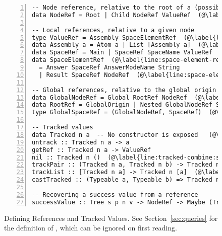 \begin{figure}[t]
\begin{lncodebox}
\begin{lstlisting}[style=haskell,numbers=left]
-- Node reference, relative to the root of a (possibly nested) tree
data NodeRef = Root | Child NodeRef ValueRef  (@\label{line:node-ref}@)

-- Local references, relative to a given node
type ValueRef = Assembly SpaceElementRef  (@\label{line:value-ref}@)
data Assembly a = Atom a | List [Assembly a]  (@\label{line:assembly}@)
data SpaceRef = Main | SpaceRef SpaceName ValueRef  (@\label{line:space-ref}@)
data SpaceElementRef  (@\label{line:space-element-ref:start}@)
  = Answer SpaceRef AnswerModeName String
  | Result SpaceRef NodeRef  (@\label{line:space-element-ref:end}@)

-- Global references, relative to the global origin
data GlobalNodeRef = Global RootRef NodeRef  (@\label{line:global-node-ref}@)
data RootRef = GlobalOrigin | Nested GlobalNodeRef SpaceRef  (@\label{line:root-ref}@)
type GlobalSpaceRef = (GlobalNodeRef, SpaceRef)  (@\label{line:global-space-ref}@)

-- Tracked values
data Tracked n a  -- No constructor is exposed   (@\label{line:tracked:start}\label{line:tracked}@)
untrack :: Tracked n a -> a
getRef :: Tracked n a -> ValueRef
nil :: Tracked n ()  (@\label{line:tracked-combine:start}@)
trackPair :: (Tracked n a, Tracked n b) -> Tracked n (a, b)   (@\label{line:track-pair}@)
trackList :: [Tracked n a] -> Tracked n [a]  (@\label{line:track-list}@)
castTracked :: (Typeable a, Typeable b) => Tracked n a -> Maybe (Tracked n b)  (@\label{line:tracked-combine:end}@) (@\label{line:tracked:end}@)

-- Recovering a success value from a reference
successValue :: Tree s p n v -> NodeRef -> Maybe (Tracked n v)  (@\label{line:success-value}@)
\end{lstlisting}
\end{lncodebox}
\vspace{-0.2cm}
\caption{Defining References and Tracked Values. See Section~\ref{sec:queries} for the definition of , which can be ignored on first reading.}\label{fig:refs-def}
\end{figure}
